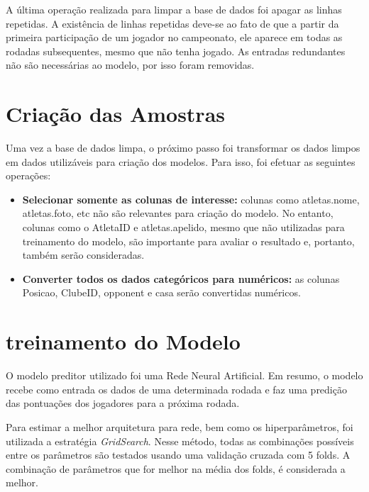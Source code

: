 \documentclass[conference]{IEEEtran}
\begin{document}
A última operação realizada para limpar  a base de dados foi apagar
as  linhas repetidas.  A existência  de linhas  repetidas deve-se  ao
fato  de que  a partir  da primeira  participação de  um jogador  no
campeonato, ele  aparece em todas  as rodadas subsequentes,  mesmo que
não tenha jogado.  As entradas redundantes não  são necessárias ao
modelo, por isso foram removidas.

\section{Criação das Amostras}

Uma vez  a base de  dados limpa, o  próximo passo foi  transformar os
dados limpos  em dados utilizáveis  para criação dos  modelos. Para
isso, foi efetuar as seguintes operações:

\begin{itemize}

\item  \textbf{Selecionar somente  as colunas  de interesse:}  colunas
como  atletas.nome,  atletas.foto,  etc   não  são  relevantes  para
criação  do   modelo.  No  entanto,   colunas  como  o   AtletaID  e
atletas.apelido, mesmo que não utilizadas para treinamento do modelo,
são importante para  avaliar o resultado e,  portanto, também serão
consideradas.

\item \textbf{Converter todos os  dados categóricos para numéricos:}
as  colunas  Posicao,  ClubeID,  opponent e  casa  serão  convertidas
numéricos.

\end{itemize}


\section{treinamento do Modelo}

O modelo preditor utilizado foi uma Rede Neural Artificial. Em resumo,
o modelo recebe como entrada os  dados de uma determinada rodada e faz
uma predição das pontuações dos jogadores para a próxima rodada.

Para   estimar  a   melhor  arquitetura   para  rede,   bem  como   os
hiperparâmetros,  foi  utilizada a  estratégia  \textit{GridSearch}.
Nesse método, todas as  combinações possíveis entre os parâmetros
são  testados  usando   uma  validação  cruzada  com   5  folds.  A
combinação de  parâmetros que  for melhor na  média dos  folds, é
considerada a melhor.
\end{document}
